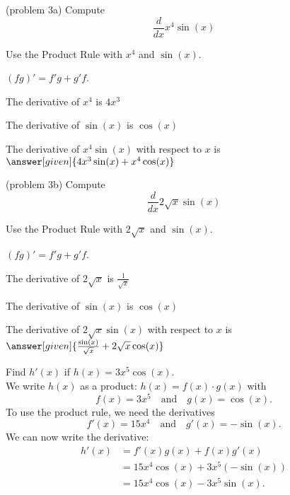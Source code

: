 \documentclass{ximera}
\begin{document}
\begin{problem}(problem 3a)
  Compute
  \[
  \frac{d}{dx} x^4\sin(x)
  \]
  
    \begin{hint}
      Use the Product Rule with $x^4$ and $\sin(x)$.
    \end{hint}
    \begin{hint}
      $(fg)' = f'g+g'f$.
    \end{hint}
    \begin{hint}
      The derivative of $x^4$ is $4x^3$
    \end{hint}
    \begin{hint}
      The derivative of $\sin(x)$ is $\cos(x)$
    \end{hint}
    
		The derivative of $x^4\sin(x)$ with respect to $x$ is
		 $\answer[given]{4x^3\sin(x) + x^4\cos(x)}$
		
\end{problem}


\begin{problem}(problem 3b)
  Compute
  \[
  \frac{d}{dx} 2\sqrt x\sin(x)
  \]
  
    \begin{hint}
      Use the Product Rule with $2\sqrt x$ and $\sin(x)$.
    \end{hint}
    \begin{hint}
      $(fg)' = f'g+g'f$.
    \end{hint}
    \begin{hint}
      The derivative of $2\sqrt x$ is $\frac{1}{\sqrt x}$
    \end{hint}
    \begin{hint}
      The derivative of $\sin(x)$ is $\cos(x)$
    \end{hint}
    
		The derivative of $2\sqrt x\sin(x)$ with respect to $x$ is
		 $\answer[given]{\frac{\sin(x)}{\sqrt x} + 2\sqrt x\cos(x)}$
		
\end{problem}


\begin{example}[example 4]
Find $h'(x)$ if $h(x) = 3x^5\cos(x)$.\\
We write $h(x)$ as a product: $h(x) = f(x)\cdot g(x)$ with
 \[f(x) = 3x^5 \quad \text{and} \quad g(x) = \cos(x).\] 
To use the product rule, we need the derivatives
\[f'(x) = 15x^4 \quad \text{and} \quad g'(x) = -\sin(x).\] 
We can now write the derivative:
\begin{align*}
h'(x) &= f'(x)g(x) + f(x)g'(x)\\
&=  15x^4 \cos(x) +3x^5(-\sin(x)) \\
&= 15x^4 \cos(x) - 3x^5\sin(x).
\end{align*}
\end{example}
\end{document}
